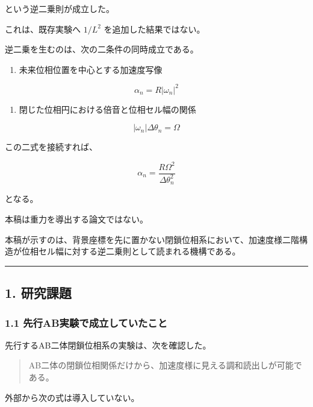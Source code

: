 \documentclass[
  10pt,
  a4paper,
]{ltjsarticle}
\providecommand{\tightlist}{%
  \setlength{\itemsep}{0pt}\setlength{\parskip}{0pt}}
\begin{document}
という逆二乗則が成立した。

これは、既存実験へ \(1/L^2\) を追加した結果ではない。

逆二乗を生むのは、次の二条件の同時成立である。

\begin{enumerate}
\def\labelenumi{\arabic{enumi}.}
\tightlist
\item
  未来位相位置を中心とする加速度写像
\end{enumerate}

\[
\alpha_n=R|\omega_n|^2
\]

\begin{enumerate}
\def\labelenumi{\arabic{enumi}.}
\setcounter{enumi}{1}
\tightlist
\item
  閉じた位相円における倍音と位相セル幅の関係
\end{enumerate}

\[
|\omega_n|\Delta\theta_n=\Omega
\]

この二式を接続すれば、

\[
\boxed{
\alpha_n
=\frac{R\Omega^2}{\Delta\theta_n^2}
}
\]

となる。

本稿は重力を導出する論文ではない。

本稿が示すのは、背景座標を先に置かない閉鎖位相系において、加速度様二階構造が位相セル幅に対する逆二乗則として読まれる機構である。

\begin{center}\rule{0.5\linewidth}{0.5pt}\end{center}

\subsection{1. 研究課題}\label{ux7814ux7a76ux8ab2ux984c}

\subsubsection{1.1
先行AB実験で成立していたこと}\label{ux5148ux884cabux5b9fux9a13ux3067ux6210ux7acbux3057ux3066ux3044ux305fux3053ux3068}

先行するAB二体閉鎖位相系の実験は、次を確認した。

\begin{quote}
AB二体の閉鎖位相関係だけから、加速度様に見える調和読出しが可能である。
\end{quote}

外部から次の式は導入していない。
\end{document}
